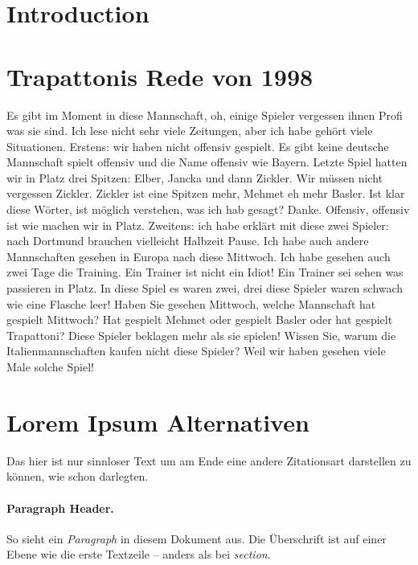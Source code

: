 \documentclass[12pt,        %
  english,ngerman,          %
  paper=a4,                 %
  captions=tablesignature,  %
  listof=numbered,          %
  bibliography=totoc,       %
  headings=small,           %
  headinclude=false,        %
  footinclude=false,        %
  parskip=half-,            %
  oneside,                  %
  DIV=12                    %
]{styles/coliartcl}
\begin{document}

\section*{Introduction}

\lipsum


\section*{Trapattonis Rede von 1998}

Es gibt im Moment in diese Mannschaft, oh, einige Spieler vergessen ihnen Profi was sie sind. Ich lese nicht sehr viele Zeitungen, aber ich habe gehört viele Situationen. Erstens: wir haben nicht offensiv gespielt. Es gibt keine deutsche Mannschaft spielt offensiv und die Name offensiv wie Bayern. Letzte Spiel hatten wir in Platz drei Spitzen: Elber, Jancka und dann Zickler. Wir müssen nicht vergessen Zickler. Zickler ist eine Spitzen mehr, Mehmet eh mehr Basler. Ist klar diese Wörter, ist möglich verstehen, was ich hab gesagt? Danke. Offensiv, offensiv ist wie machen wir in Platz. Zweitens: ich habe erklärt mit diese zwei Spieler: nach Dortmund brauchen vielleicht Halbzeit Pause. Ich habe auch andere Mannschaften gesehen in Europa nach diese Mittwoch. Ich habe gesehen auch zwei Tage die Training. Ein Trainer ist nicht ein Idiot! Ein Trainer sei sehen was passieren in Platz. In diese Spiel es waren zwei, drei diese Spieler waren schwach wie eine Flasche leer! Haben Sie gesehen Mittwoch, welche Mannschaft hat gespielt Mittwoch? Hat gespielt Mehmet oder gespielt Basler oder hat gespielt Trapattoni? Diese Spieler beklagen mehr als sie spielen! Wissen Sie, warum die Italienmannschaften kaufen nicht diese Spieler? Weil wir haben gesehen viele Male solche Spiel! \cite{Bottou2014}


\section*{Lorem Ipsum Alternativen}

Das hier ist nur sinnloser Text um am Ende eine andere Zitationsart darstellen zu können, wie schon \citealp{Wartena2015} darlegten.

\paragraph*{Paragraph Header.} So sieht ein \textit{Paragraph} in diesem Dokument aus. 
Die Überschrift ist auf einer Ebene wie die erste Textzeile -- anders als bei \textit{section}.
\end{document}
